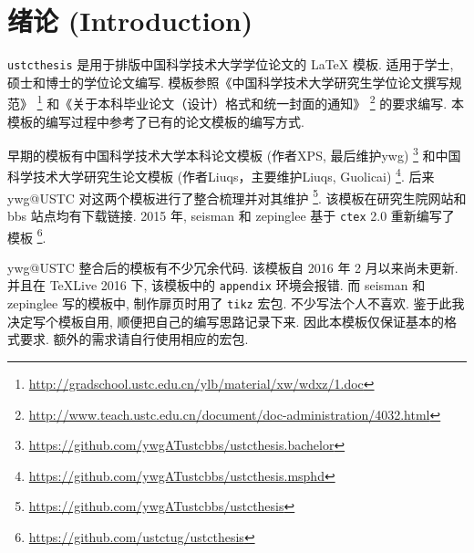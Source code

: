 \chapter{绪论 (Introduction)}

\verb|ustcthesis| 是用于排版中国科学技术大学学位论文的 \LaTeX{} 模板. 适用于学士, 硕士和博士的学位论文编写. 模板参照《中国科学技术大学研究生学位论文撰写规范》
\footnote{\url{http://gradschool.ustc.edu.cn/ylb/material/xw/wdxz/1.doc}}
和《关于本科毕业论文（设计）格式和统一封面的通知》
\footnote{\url{http://www.teach.ustc.edu.cn/document/doc-administration/4032.html}}
的要求编写. 本模板的编写过程中参考了已有的论文模板的编写方式.

早期的模板有中国科学技术大学本科论文模板 (作者XPS, 最后维护ywg)
\footnote{\url{https://github.com/ywgATustcbbs/ustcthesis.bachelor}}
和中国科学技术大学研究生论文模板 (作者Liuqs，主要维护Liuqs, Guolicai)
\footnote{\url{https://github.com/ywgATustcbbs/ustcthesis.msphd}}.
后来 ywg@USTC 对这两个模板进行了整合梳理并对其维护
\footnote{\url{https://github.com/ywgATustcbbs/ustcthesis}}.
该模板在研究生院网站和 bbs 站点均有下载链接. 2015 年, seisman 和 zepinglee 基于 \verb|ctex| 2.0 重新编写了模板
\footnote{\url{https://github.com/ustctug/ustcthesis}}.

ywg@USTC 整合后的模板有不少冗余代码. 该模板自 2016 年 2 月以来尚未更新. 并且在 TeXLive 2016 下, 该模板中的 \verb|appendix| 环境会报错. 而 seisman 和 zepinglee 写的模板中, 制作扉页时用了 \verb|tikz| 宏包. 不少写法个人不喜欢. 鉴于此我决定写个模板自用, 顺便把自己的编写思路记录下来. 因此本模板仅保证基本的格式要求. 额外的需求请自行使用相应的宏包.
